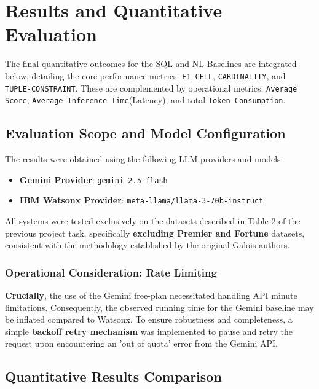 \section{Results and Quantitative Evaluation}
\label{sec:sql_nl_results_evaluation}

The final quantitative outcomes for the SQL and NL Baselines are integrated below, detailing the core performance metrics: \texttt{F1-CELL}, \texttt{CARDINALITY}, and \texttt{TUPLE-CONSTRAINT}. These are complemented by operational metrics: \texttt{Average Score}, \texttt{Average Inference Time}(Latency), and total \texttt{Token Consumption}.
\vspace{2em}
\subsection{Evaluation Scope and Model Configuration}

The results were obtained using the following LLM providers and models:

\begin{itemize}[leftmargin=*, label=$\diamond$]
    \item \textbf{Gemini Provider}: \texttt{gemini-2.5-flash}
    \item \textbf{IBM Watsonx Provider}: \texttt{meta-llama/llama-3-70b-instruct}
\end{itemize}
All systems were tested exclusively on the datasets described in Table 2 of the previous project task, specifically \textbf{excluding Premier and Fortune} datasets, consistent with the methodology established by the original Galois authors.

\subsubsection{Operational Consideration: Rate Limiting}
\textbf{Crucially}, the use of the Gemini free-plan necessitated handling API minute limitations. Consequently, the observed running time for the Gemini baseline may be inflated compared to Watsonx. To ensure robustness and completeness, a simple \textbf{backoff retry mechanism} was implemented to pause and retry the request upon encountering an 'out of quota' error from the Gemini API.

\vspace{2em}
\subsection{Quantitative Results Comparison}


